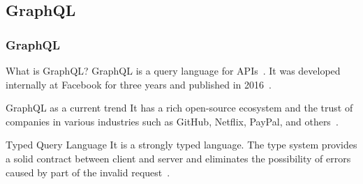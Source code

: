 \subsection{GraphQL}

\begin{frame}\frametitle{GraphQL}

  \begin{block}{What is GraphQL?}
    GraphQL is a query language for APIs~\cite{gql-spec}. It was developed internally at  Facebook for three years and published in 2016~\cite{initial-analysis-of-gql}. 
  \end{block}

  \begin{block}{GraphQL as a current trend}
    It has a rich open-source ecosystem and the trust of companies in various industries such as GitHub, Netflix, PayPal, and others~\cite{morph-gql-1,gql-healthcare}.
  \end{block}

\begin{block}{Typed Query Language}
  It is a strongly typed language. The type system provides a solid contract between client and server and eliminates the possibility of errors caused by part of the invalid request~\cite{real-time-sys-arc-based-on-gql}.
\end{block}

\end{frame}

